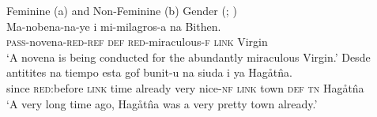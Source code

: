 \documentclass[output=collectionpaper]{langsci/langscibook}
\begin{document}
\ea\label{ex:dgm:8:Chamorro}
 Feminine (a) and Non-Feminine (b) Gender (; \citealt[123]{Stolz2012})\\
\ea
\gll Ma-nobena-na-ye i mi-milagros-a na Bithen. \\
\textsc{pass-}novena-\textsc{red-ref} \textsc{def} \textsc{red}-miraculous-\textsc{f} \textsc{link} Virgin \\
\glt`A novena is being conducted for the abundantly miraculous Virgin.'
\ex
\gll Desde antitites na tiempo esta gof bunit-u na siuda i ya Hag\r{a}t\^na. \\
since \textsc{red:}before \textsc{link} time already very nice-\textsc{nf} \textsc{link} town \textsc{def} \textsc{tn} Hag\r{a}t\^na \\
\glt `A very long time ago,  Hag\r{a}t\^na was a very pretty town already.'
\z
\z
\end{document}
